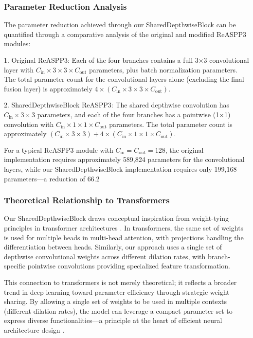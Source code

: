 \documentclass[12pt,a4paper]{article}
\begin{document}
\subsubsection{Parameter Reduction Analysis}

The parameter reduction achieved through our SharedDepthwiseBlock can be quantified through a comparative analysis of the original and modified ReASPP3 modules:

1. Original ReASPP3: Each of the four branches contains a full 3×3 convolutional layer with $C_{\textrm{in}} \times 3 \times 3 \times C_{\textrm{out}}$ parameters, plus batch normalization parameters. The total parameter count for the convolutional layers alone (excluding the final fusion layer) is approximately $4 \times (C_{\textrm{in}} \times 3 \times 3 \times C_{\textrm{out}})$.

2. SharedDepthwiseBlock ReASPP3: The shared depthwise convolution has $C_{\textrm{in}} \times 3 \times 3$ parameters, and each of the four branches has a pointwise (1×1) convolution with $C_{\textrm{in}} \times 1 \times 1 \times C_{\textrm{out}}$ parameters. The total parameter count is approximately $(C_{\textrm{in}} \times 3 \times 3) + 4 \times (C_{\textrm{in}} \times 1 \times 1 \times C_{\textrm{out}})$.

For a typical ReASPP3 module with $C_{\textrm{in}} = C_{\textrm{out}} = 128$, the original implementation requires approximately 589,824 parameters for the convolutional layers, while our SharedDepthwiseBlock implementation requires only 199,168 parameters—a reduction of 66.2%

\subsubsection{Theoretical Relationship to Transformers}

Our SharedDepthwiseBlock draws conceptual inspiration from weight-tying principles in transformer architectures \cite{Jeong2021, Vaswani2017Attention}. In transformers, the same set of weights is used for multiple heads in multi-head attention, with projections handling the differentiation between heads. Similarly, our approach uses a single set of depthwise convolutional weights across different dilation rates, with branch-specific pointwise convolutions providing specialized feature transformation.

This connection to transformers is not merely theoretical; it reflects a broader trend in deep learning toward parameter efficiency through strategic weight sharing. By allowing a single set of weights to be used in multiple contexts (different dilation rates), the model can leverage a compact parameter set to express diverse functionalities—a principle at the heart of efficient neural architecture design \cite{Howard2019Searching, Jeong2021}.
\end{document}
